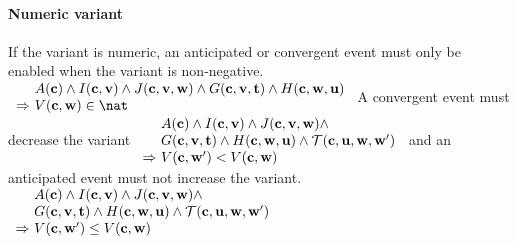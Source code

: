 \paragraph{Numeric variant}
\label{numeric_variant}
  If the variant is numeric, an anticipated or convergent event
  must only be enabled when the variant is non-negative.
%
  {$\begin{array}{r@{\ }l}
      & \axioms \land \absinvariants \land \concinvariants \land
      \absguards \land \concguards \\
      \limp & V(\allconstants,\concvariables)\in\nat
    \end{array}$}
A convergent event must decrease the variant
%
  {$\begin{array}{r@{\ }l}
      & \axioms \land \absinvariants \land \concinvariants \land \\
      & \absguards \land \concguards \land \bapred \\
      \limp & V(\allconstants,\concvariables')<V(\allconstants,\concvariables)
    \end{array}$}
and an anticipated event must not increase the variant.
%
  {$\begin{array}{r@{\ }l}
      & \axioms \land \absinvariants \land \concinvariants \land \\
      & \absguards \land \concguards \land \bapred \\
      \limp & V(\allconstants,\concvariables')\leq V(\allconstants,\concvariables)
    \end{array}$}

